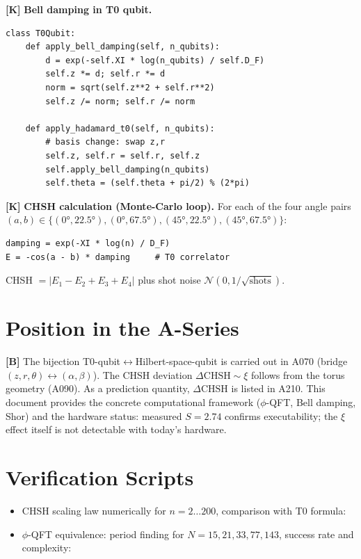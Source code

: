 \textbf{[K]} \textbf{Bell damping in T0 qubit.}
\begin{verbatim}
class T0Qubit:
    def apply_bell_damping(self, n_qubits):
        d = exp(-self.XI * log(n_qubits) / self.D_F)
        self.z *= d; self.r *= d
        norm = sqrt(self.z**2 + self.r**2)
        self.z /= norm; self.r /= norm

    def apply_hadamard_t0(self, n_qubits):
        # basis change: swap z,r
        self.z, self.r = self.r, self.z
        self.apply_bell_damping(n_qubits)
        self.theta = (self.theta + pi/2) % (2*pi)
\end{verbatim}

\textbf{[K]} \textbf{CHSH calculation (Monte-Carlo loop).} For each of the four
angle pairs $(a,b)\in\{(0°,22{.}5°),(0°,67{.}5°),(45°,22{.}5°),(45°,67{.}5°)\}$:
\begin{verbatim}
damping = exp(-XI * log(n) / D_F)
E = -cos(a - b) * damping     # T0 correlator
\end{verbatim}
CHSH $= |E_1 - E_2 + E_3 + E_4|$ plus shot noise $\mathcal N(0,1/\sqrt{\text{shots}})$.

\section{Position in the A-Series}

\textbf{[B]} The bijection T0-qubit$\leftrightarrow$Hilbert-space-qubit is carried
out in A070 (bridge $(z,r,\theta)\leftrightarrow(\alpha,\beta)$). The CHSH
deviation $\Delta\text{CHSH}\sim\xi$ follows from the torus geometry (A090). As
a prediction quantity, $\Delta\text{CHSH}$ is listed in A210. This document
provides the concrete computational framework ($\phi$-QFT, Bell damping, Shor)
and the hardware status: measured $S=2{.}74$ confirms executability; the $\xi$
effect itself is not detectable with today's hardware.

\section{Verification Scripts}

\begin{itemize}[leftmargin=2em,itemsep=2pt,topsep=2pt]
  \item CHSH scaling law numerically for $n=2\ldots200$, comparison with T0 formula:
  \item $\phi$-QFT equivalence: period finding for $N=15,21,33,77,143$,
    success rate and complexity:
\end{itemize}

